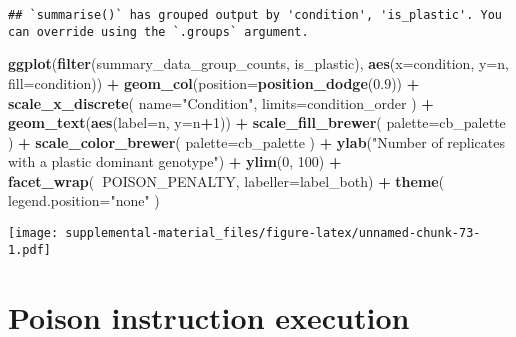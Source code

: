 \documentclass[]{book}
\newenvironment{Shaded}{\begin{snugshade}}{\end{snugshade}}
\newcommand{\DataTypeTok}[1]{\textcolor[rgb]{0.13,0.29,0.53}{#1}}
\newcommand{\DecValTok}[1]{\textcolor[rgb]{0.00,0.00,0.81}{#1}}
\newcommand{\FloatTok}[1]{\textcolor[rgb]{0.00,0.00,0.81}{#1}}
\newcommand{\KeywordTok}[1]{\textcolor[rgb]{0.13,0.29,0.53}{\textbf{#1}}}
\newcommand{\NormalTok}[1]{#1}
\newcommand{\OperatorTok}[1]{\textcolor[rgb]{0.81,0.36,0.00}{\textbf{#1}}}
\newcommand{\StringTok}[1]{\textcolor[rgb]{0.31,0.60,0.02}{#1}}
\begin{document}
\begin{verbatim}
## `summarise()` has grouped output by 'condition', 'is_plastic'. You can override using the `.groups` argument.
\end{verbatim}

\begin{Shaded}
\begin{Highlighting}[]
\KeywordTok{ggplot}\NormalTok{(}\KeywordTok{filter}\NormalTok{(summary_data_group_counts, is_plastic), }\KeywordTok{aes}\NormalTok{(}\DataTypeTok{x=}\NormalTok{condition, }\DataTypeTok{y=}\NormalTok{n, }\DataTypeTok{fill=}\NormalTok{condition)) }\OperatorTok{+}
\StringTok{  }\KeywordTok{geom_col}\NormalTok{(}\DataTypeTok{position=}\KeywordTok{position_dodge}\NormalTok{(}\FloatTok{0.9}\NormalTok{)) }\OperatorTok{+}
\StringTok{  }\KeywordTok{scale_x_discrete}\NormalTok{(}
    \DataTypeTok{name=}\StringTok{"Condition"}\NormalTok{,}
    \DataTypeTok{limits=}\NormalTok{condition_order}
\NormalTok{  ) }\OperatorTok{+}
\StringTok{  }\KeywordTok{geom_text}\NormalTok{(}\KeywordTok{aes}\NormalTok{(}\DataTypeTok{label=}\NormalTok{n, }\DataTypeTok{y=}\NormalTok{n}\OperatorTok{+}\DecValTok{1}\NormalTok{)) }\OperatorTok{+}
\StringTok{  }\KeywordTok{scale_fill_brewer}\NormalTok{(}
    \DataTypeTok{palette=}\NormalTok{cb_palette}
\NormalTok{  ) }\OperatorTok{+}
\StringTok{  }\KeywordTok{scale_color_brewer}\NormalTok{(}
    \DataTypeTok{palette=}\NormalTok{cb_palette}
\NormalTok{  ) }\OperatorTok{+}
\StringTok{  }\KeywordTok{ylab}\NormalTok{(}\StringTok{"Number of replicates with a plastic dominant genotype"}\NormalTok{) }\OperatorTok{+}
\StringTok{  }\KeywordTok{ylim}\NormalTok{(}\DecValTok{0}\NormalTok{, }\DecValTok{100}\NormalTok{) }\OperatorTok{+}
\StringTok{  }\KeywordTok{facet_wrap}\NormalTok{(}\OperatorTok{~}\NormalTok{POISON_PENALTY, }\DataTypeTok{labeller=}\NormalTok{label_both) }\OperatorTok{+}
\StringTok{  }\KeywordTok{theme}\NormalTok{(}
    \DataTypeTok{legend.position=}\StringTok{"none"}
\NormalTok{  )}
\end{Highlighting}
\end{Shaded}

\texttt{[image: supplemental-material\_files/figure-latex/unnamed-chunk-73-1.pdf]}

\hypertarget{poison-instruction-execution}{%
\section{Poison instruction execution}\label{poison-instruction-execution}}
\end{document}
